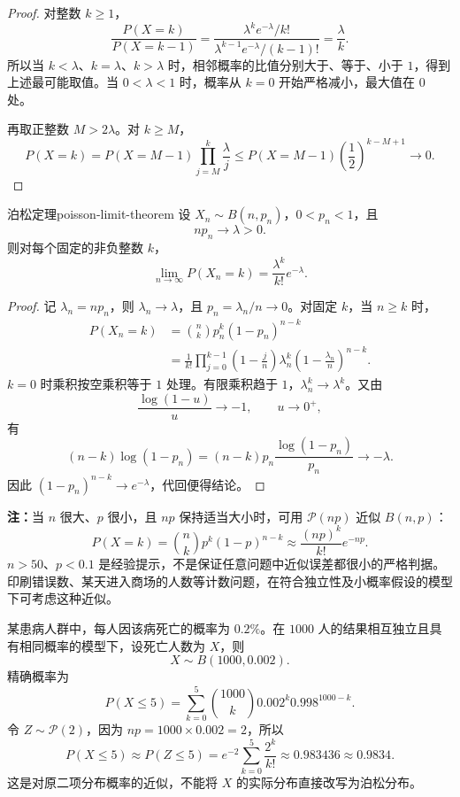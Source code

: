 \begin{proof}
对整数 $k\geq1$，
\[
\frac{P(X=k)}{P(X=k-1)}
=\frac{\lambda^ke^{-\lambda}/k!}
{\lambda^{k-1}e^{-\lambda}/(k-1)!}
=\frac{\lambda}{k}.
\]
所以当 $k<\lambda$、$k=\lambda$、$k>\lambda$ 时，相邻概率的比值分别大于、等于、小于 $1$，得到上述最可能取值。当 $0<\lambda<1$ 时，概率从 $k=0$ 开始严格减小，最大值在 $0$ 处。

再取正整数 $M>2\lambda$。对 $k\geq M$，
\[
P(X=k)=P(X=M-1)\prod_{j=M}^{k}\frac{\lambda}{j}
\leq P(X=M-1)\left(\frac12\right)^{k-M+1}
\longrightarrow0.
\]
\end{proof}

\begin{mytheorem}{泊松定理}{poisson-limit-theorem}
设 $X_n\sim B(n,p_n)$，$0<p_n<1$，且
\[
np_n\longrightarrow\lambda>0.
\]
则对每个固定的非负整数 $k$，
\[
\lim_{n\to\infty}P(X_n=k)=\frac{\lambda^k}{k!}e^{-\lambda}.
\]
\end{mytheorem}

\begin{proof}
记 $\lambda_n=np_n$，则 $\lambda_n\to\lambda$，且 $p_n=\lambda_n/n\to0$。对固定 $k$，当 $n\geq k$ 时，
\[
\begin{aligned}
P(X_n=k)
&=\binom nk p_n^k(1-p_n)^{n-k}\\
&=\frac1{k!}
\prod_{j=0}^{k-1}\left(1-\frac jn\right)
\lambda_n^k\left(1-\frac{\lambda_n}{n}\right)^{n-k}.
\end{aligned}
\]
$k=0$ 时乘积按空乘积等于 $1$ 处理。有限乘积趋于 $1$，$\lambda_n^k\to\lambda^k$。又由
\[
\frac{\log(1-u)}{u}\longrightarrow-1,\qquad u\to0^+,
\]
有
\[
(n-k)\log(1-p_n)
=(n-k)p_n\frac{\log(1-p_n)}{p_n}
\longrightarrow-\lambda.
\]
因此 $(1-p_n)^{n-k}\to e^{-\lambda}$，代回便得结论。
\end{proof}

\textbf{注：}\quad 当 $n$ 很大、$p$ 很小，且 $np$ 保持适当大小时，可用 $\mathcal P(np)$ 近似 $B(n,p)$：
\[
P(X=k)=\binom nk p^k(1-p)^{n-k}
\approx\frac{(np)^k}{k!}e^{-np}.
\]
$n>50$、$p<0.1$ 是经验提示，不是保证任意问题中近似误差都很小的严格判据。印刷错误数、某天进入商场的人数等计数问题，在符合独立性及小概率假设的模型下可考虑这种近似。

\begin{example}[死亡人数不超过五人的泊松近似]
某患病人群中，每人因该病死亡的概率为 $0.2\%$。在 $1000$ 人的结果相互独立且具有相同概率的模型下，设死亡人数为 $X$，则
\[
X\sim B(1000,0.002).
\]
精确概率为
\[
P(X\leq5)
=\sum_{k=0}^{5}\binom{1000}{k}0.002^k0.998^{1000-k}.
\]
令 $Z\sim\mathcal P(2)$，因为 $np=1000\times0.002=2$，所以
\[
P(X\leq5)\approx P(Z\leq5)
=e^{-2}\sum_{k=0}^{5}\frac{2^k}{k!}
\approx0.983436\approx0.9834.
\]
这是对原二项分布概率的近似，不能将 $X$ 的实际分布直接改写为泊松分布。
\end{example}

